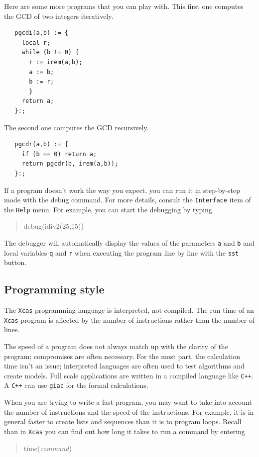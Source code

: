 \documentclass{article}
\newcommand{\xcasin}[1]
{\begin{quote}\ttfamily
#1
\end{quote}}
\begin{document}
Here are some more programs that you can play with.  This first one
computes the GCD of two integers iteratively.
\begin{verbatim}
   pgcdi(a,b) := {
     local r;
     while (b != 0) {
       r := irem(a,b);
       a := b;
       b := r;
       }
     return a;
   }:;
\end{verbatim}
The second one computes the GCD recursively.
\begin{verbatim}
   pgcdr(a,b) := {
     if (b == 0) return a;
     return pgcdr(b, irem(a,b));
   }:;
\end{verbatim}

If a program doesn't work the way you expect, you can run it in
step-by-step mode with the debug command.  For more details, consult
the \texttt{Interface} item of the \texttt{Help} menu.  For example,
you can start the debugging by typing
\xcasin{debug(idiv2(25,15))}
The debugger will automatically display the values of the parameters
\texttt{a} and \texttt{b} and local variables \texttt{q} and
\texttt{r} when executing the program line by line with the
\texttt{sst} button.

\subsection{Programming style}

The \texttt{Xcas} programming language is interpreted, not compiled.
The run time of an \texttt{Xcas} program is affected by the number of
instructions rather than the number of lines.  

The speed of a program does not always match up with the clarity of
the program; compromises are often necessary.  For the most part, the
calculation time isn't an issue; interpreted languages are often used
to test algorithms and create models.   Full scale applications are
written in a compiled language like \texttt{C++}.  A \texttt{C++} can
use \texttt{giac} for the formal calculations.

When you are trying to write a fast program, you may want to take into
account the number of instructions and the speed of the instructions.
For example, it is in general faster to create lists and sequences
than it is to program loops.  Recall than in \texttt{Xcas} you can
find out how long it takes to run a command by entering
\xcasin{time(\textit{command})}

\newpage

\printindex
\end{document}
